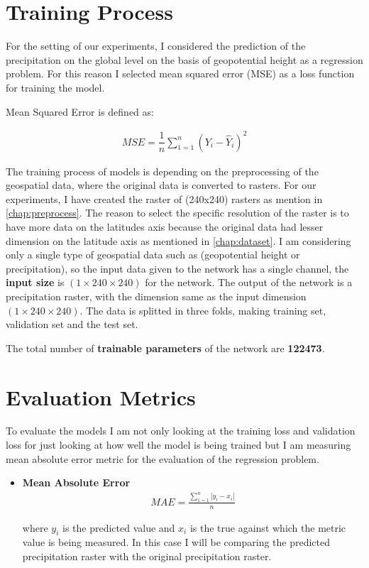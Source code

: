 \newpage

\section{Training Process}

For the setting of our experiments, I considered the prediction of the precipitation on the global level on the basis of geopotential height as a regression problem. For this reason I selected mean squared error (MSE) as a loss function for training the model.

Mean Squared Error is defined as:

\begin{gather*}
    MSE = \dfrac{1}{n}\sum_{1 = 1}^{n}(Y_i-\hat{Y}_i )^2
\end{gather*}

The training process of models is depending on the preprocessing of the geospatial data, where the original data is converted to rasters. For our experiments, I have created the raster of (240x240) rasters as mention in \ref{chap:preprocess}. The reason to select the specific resolution of the raster is to have more data on the latitudes axis because the original data had lesser dimension on the latitude axis as mentioned in \ref{chap:dataset}.
I am considering only a single type of geospatial data such as (geopotential height or precipitation), so the input data given to the network has a single channel,  the \textbf{input size} is $(1 \times 240  \times 240)$ for the network.
The output of the network is a precipitation raster, with the dimension same as the input dimension $(1 \times 240  \times 240)$. The data is splitted in three folds, making training set, validation set and the test set.

The total number of \textbf{trainable parameters} of the network are \textbf{122473}.
\section{Evaluation Metrics}

To evaluate the models I am not only looking at the training loss and validation loss for just looking at how well the model is being trained but I am measuring mean absolute error metric for the evaluation of the regression problem.
\begin{itemize}
    \item \textbf{Mean Absolute Error}\\
          \begin{gather*}
              MAE = \frac{\sum_{1 = 1}^{n}\left\lvert
                  y_i - x_i
                  \right\rvert}{n}
          \end{gather*}

          where $y_i$ is the predicted value and $x_i$ is the true against which the metric value is being measured. In this case I will be comparing the predicted precipitation raster with the original precipitation raster.
\end{itemize}